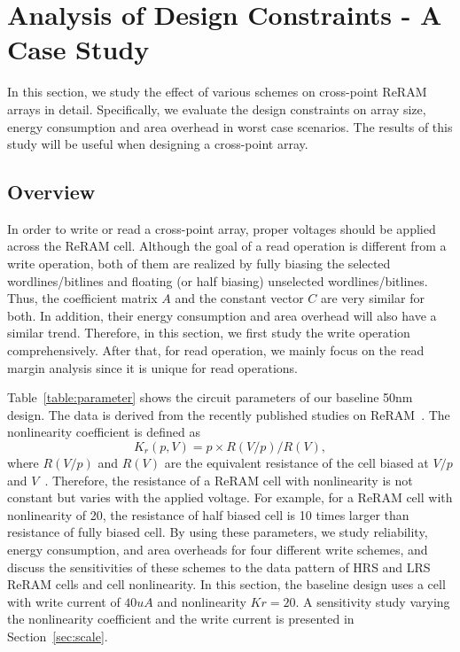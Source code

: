 \vspace{-4pt}
\section{Analysis of Design Constraints - A Case Study}\label{sec:w_and_r}

In this section, we study the effect of various schemes on cross-point
ReRAM arrays in detail. Specifically, we evaluate the design constraints
on array size, energy consumption and area overhead in worst case
scenarios. The results of this study will be useful when designing a
cross-point array.

\vspace{-10pt}
\subsection{Overview}
In order to write or read a cross-point array, proper voltages should be
applied across the ReRAM cell. Although the goal of a read operation is
different from a write operation, both of them are realized by fully
biasing the selected wordlines/bitlines and floating (or half biasing)
unselected wordlines/bitlines. Thus, the coefficient matrix $A$ and the
constant vector $C$ are very similar for both. In addition, their energy
consumption and area overhead will also have a similar trend. Therefore,
in this section, we first study the write operation comprehensively. After
that, for read operation, we mainly focus on the read margin analysis
since it is unique for read operations.

Table~\ref{table:parameter} shows the circuit parameters of our baseline
50nm design. The data is derived from the recently published studies on
ReRAM~\cite{ReRAM_overview,memristor:Cong,ReRAM_Renesas}. The nonlinearity
coefficient is defined as
\begin{equation}
K_r(p,V) = p \times R(V/p)/R(V),
\end{equation}
where $R(V/p)$ and $R(V)$ are the equivalent resistance of the cell biased
at $V/p$ and $V$~\cite{memristor:Cong}. Therefore, the resistance of a
ReRAM cell with nonlinearity is not constant but varies with the applied
voltage. For example, for a ReRAM cell with nonlinearity of 20, the
resistance of half biased cell is 10 times larger than resistance of fully
biased cell. By using these parameters, we study reliability, energy
consumption, and area overheads for four different write schemes, and
discuss the sensitivities of these schemes to the data pattern of HRS and
LRS ReRAM cells and cell nonlinearity. In this section, the baseline
design uses a cell with write current of $40 uA$ and nonlinearity $Kr=20$.
A sensitivity study varying the nonlinearity coefficient and the write
current is presented in Section~\ref{sec:scale}.

